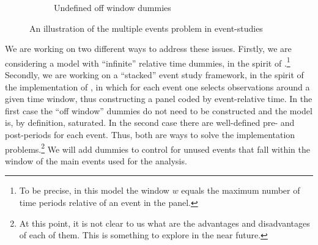 \begin{figure}[t!]
\begin{subfigure}{1\textwidth}
            \caption{Undefined off window dummies}
        \end{subfigure}
        \caption{An illustration of the multiple events problem in event-studies}
        \label{fig:multiple-events-example}
    \end{figure}
    
    We are working on two different ways to address these issues. Firstly, we are considering a model with ``infinite'' relative time dummies, in the spirit of \textcite[][, equation 1]{BorusyakJaravel2017}.\footnote{To be precise, in this model the window $w$ equals the maximum number of time periods relative of an event in the panel.} Secondly, we are working on a ``stacked'' event study framework, in the spirit of the implementation of \textcite{cengiz2019effect}, in which for each event one selects observations around a given time window, thus constructing a panel coded by event-relative time. In the first case the ``off window'' dummies do not need to be constructed and the model is, by definition, saturated. In the second case there are well-defined pre- and post-periods for each event. Thus, both are ways to solve the implementation problems.\footnote{At this point, it is not clear to us what are the advantages and disadvantages of each of them. This is something to explore in the near future.} We will add dummies to control for unused events that fall within the window of the main events used for the analysis.
    

